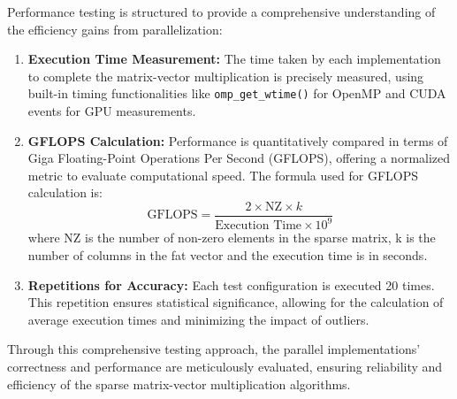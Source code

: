 \documentclass[12pt,oneside]{book} %
\begin{document}
Performance testing is structured to provide a comprehensive understanding of
the efficiency gains from parallelization:
\begin{enumerate}
    \item \textbf{Execution Time Measurement:} The time taken by each implementation to complete the matrix-vector multiplication is precisely measured, using built-in timing functionalities like \texttt{omp\_get\_wtime()} for OpenMP and CUDA events for GPU measurements.
    \item \textbf{GFLOPS Calculation:} Performance is quantitatively compared in terms of Giga Floating-Point Operations Per Second (GFLOPS), offering a normalized metric to evaluate computational speed. The formula used for GFLOPS calculation is:
          \begin{equation}
              \text{GFLOPS} = \frac{2 \times \text{NZ} \times k}{\text{Execution Time} \times 10^9}
          \end{equation}
          where NZ is the number of non-zero elements in the sparse matrix, k is the number of columns in the fat vector and the execution time is in seconds.
    \item \textbf{Repetitions for Accuracy:} Each test configuration is executed 20 times. This repetition ensures statistical significance, allowing for the calculation of average execution times and minimizing the impact of outliers.
\end{enumerate}

Through this comprehensive testing approach, the parallel implementations'
correctness and performance are meticulously evaluated, ensuring reliability
and efficiency of the sparse matrix-vector multiplication algorithms.
\end{document}
